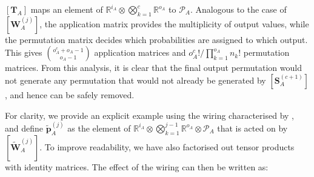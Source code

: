 \documentclass[10pt, a4paper]{article}
\numberwithin{equation}{section} %
\theoremstyle{definition}
\theoremstyle{plain}
\newcommand{\?}{\mathrel{?}} %
\newcommand{\R}{\mathbb{R}} %
\newcommand{\cvec}[1]{\boldsymbol{\mathbf{#1}}}    %
\newcommand{\matr}[2][]{\left[\mathbf{#2}#1\right]} %
\newcommand{\sP}{\mathcal{P}}
\begin{document}
                \(\matr[_A]{T}\) maps an element of \(\R^{i_A} \otimes \bigotimes_{k=1}^{c} \R^{o_A}\) to \(\sP_A\). Analogous to the case of \(\matr[^{(j)}_A]{W}\), the application matrix provides the multiplicity of output values, while the permutation matrix decides which probabilities are assigned to which output. This gives \(\binom{o_A^c + o_A-1}{o_A-1}\) application matrices and \(o_A^c!/\prod_{k=1}^{o_A} n_k!\) permutation matrices. From this analysis, it is clear that the final output permutation would not generate any permutation that would not already be generated by \(\matr[_A^{(c+1)}]{S}\), and hence can be safely removed.

                For clarity, we provide an explicit example using the wiring characterised by , and define \(\cvec{\tilde{p}}_A^{(j)}\) as the element of \(\R^{i_A} \otimes \bigotimes_{k=1}^{j-1} \R^{o_A} \otimes \sP_A\) that is acted on by \(\matr[_A^{(j)}]{\tilde{W}}\). To improve readability, we have also factorised out tensor products with identity matrices. The effect of the wiring can then be written as:
\end{document}
